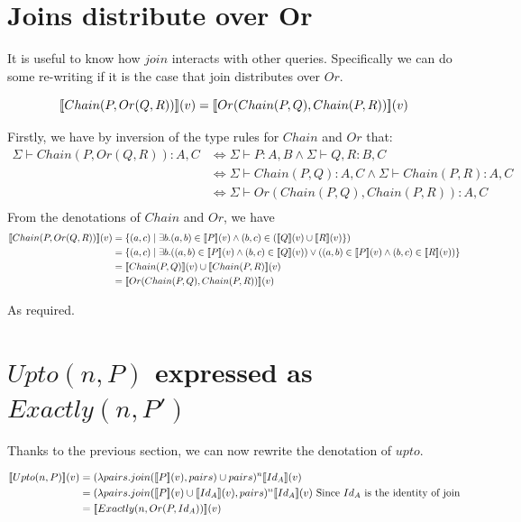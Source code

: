 \documentclass[12pt,a4paper,twoside,openright]{report}
\newcommand{\db}[1]{{\bf [\![}#1{\bf ]\!]}}
\newcommand{\deno}[1]{\db{#1}(v)}
\newcommand{\setComp}[2]{\left\lbrace #1 \mid #2 \right\rbrace}
\newcommand{\typeRule}[2]{\Sigma\vdash #1 \colon #2}
\newcommand{\denoRule}[2]{#1 \in \deno{#2}}
\begin{document}
\section{Joins distribute over Or}
It is useful to know how $join$ interacts with other queries. Specifically we can do some re-writing if it is the case that join distributes over $Or$. 

\begin{equation}
\deno{Chain(P, Or(Q, R))} = \deno{Or(Chain(P,Q), Chain(P, R))}
\end{equation}

Firstly, we have by inversion of the type rules for $Chain$ and $Or$ that:
\begin{equation}\label{typeEquality}
\begin{split}
	\typeRule{Chain(P, Or(Q, R))}{A, C} & \Leftrightarrow \typeRule{P}{A, B} \wedge \typeRule{Q, R}{B, C}\\
									   & \Leftrightarrow \typeRule{Chain(P,Q)}{A, C} \wedge \typeRule{Chain(P, R)}{A, C}\\
									   & \Leftrightarrow \typeRule{Or(Chain(P,Q), Chain(P, R))}{A, C}\\
\end{split}
\end{equation}
From the denotations of $Chain$ and $Or$, we have
\begin{equation}\label{denotationalEquality}
\begin{split}
\deno{Chain(P, Or(Q, R))} & = \setComp{(a, c)}{\exists b. \denoRule{(a, b)}{P} \wedge (b,c) \in (\deno{Q} \cup \deno{R}})\\
						 & = \setComp{(a, c)}{\exists b. (\denoRule{(a, b)}{P} \wedge \denoRule{(b,c)}{Q}) \vee (\denoRule{(a, b)}{P} \wedge \denoRule{(b,c)}{R})}\\
						 & = \deno{Chain(P, Q)} \cup \deno{Chain(P, R)}\\
						 & = \deno{Or(Chain(P, Q), Chain(P, R))}
\end{split}
\end{equation}

As required.


\section{$Upto(n, P)$ expressed as $Exactly(n, P')$}
\label{UptoOpt}
Thanks to the previous section, we can now rewrite the denotation of $upto$.

\begin{equation}
\label{UptoToExactly}
\begin{split}
\deno{Upto(n, P)} & = (\lambda pairs. join(\deno{P}, pairs) \cup pairs)^n \deno{Id_A}\\
				  & = (\lambda pairs. join(\deno{P} \cup \deno{Id_A}, pairs)^n \deno{Id_A} \mbox{ Since $Id_A$ is the identity of join}\\
				  & = \deno{Exactly(n, Or(P, Id_A))}
\end{split}
\end{equation}
\end{document}
